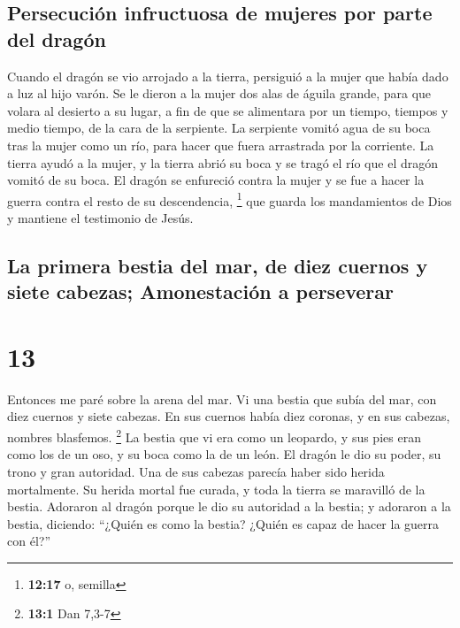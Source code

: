 \hypertarget{persecuciuxf3n-infructuosa-de-mujeres-por-parte-del-draguxf3n}{%
\subsection{Persecución infructuosa de mujeres por parte del
dragón}\label{persecuciuxf3n-infructuosa-de-mujeres-por-parte-del-draguxf3n}}

 Cuando el dragón se vio arrojado a la tierra, persiguió
a la mujer que había dado a luz al hijo varón.  Se le
dieron a la mujer dos alas de águila grande, para que volara al desierto
a su lugar, a fin de que se alimentara por un tiempo, tiempos y medio
tiempo, de la cara de la serpiente.  La serpiente vomitó
agua de su boca tras la mujer como un río, para hacer que fuera
arrastrada por la corriente.  La tierra ayudó a la mujer,
y la tierra abrió su boca y se tragó el río que el dragón vomitó de su
boca.  El dragón se enfureció contra la mujer y se fue a
hacer la guerra contra el resto de su descendencia, \footnote{\textbf{12:17}
  o, semilla} que guarda los mandamientos de Dios y mantiene el
testimonio de Jesús.

\hypertarget{la-primera-bestia-del-mar-de-diez-cuernos-y-siete-cabezas-amonestaciuxf3n-a-perseverar}{%
\subsection{La primera bestia del mar, de diez cuernos y siete cabezas;
Amonestación a
perseverar}\label{la-primera-bestia-del-mar-de-diez-cuernos-y-siete-cabezas-amonestaciuxf3n-a-perseverar}}

\hypertarget{section-12}{%
\section{13}\label{section-12}}

 Entonces me paré sobre la arena del mar. Vi una bestia
que subía del mar, con diez cuernos y siete cabezas. En sus cuernos
había diez coronas, y en sus cabezas, nombres blasfemos. \footnote{\textbf{13:1}
  Dan 7,3-7}  La bestia que vi era como un leopardo, y sus
pies eran como los de un oso, y su boca como la de un león. El dragón le
dio su poder, su trono y gran autoridad.  Una de sus
cabezas parecía haber sido herida mortalmente. Su herida mortal fue
curada, y toda la tierra se maravilló de la bestia. 
Adoraron al dragón porque le dio su autoridad a la bestia; y adoraron a
la bestia, diciendo: ``¿Quién es como la bestia? ¿Quién es capaz de
hacer la guerra con él?''

